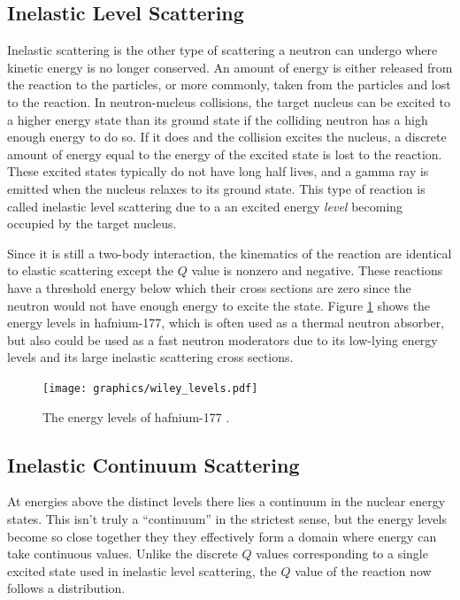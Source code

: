 \subsection{Inelastic Level Scattering}

Inelastic scattering is the other type of scattering a neutron can undergo where kinetic energy is no longer conserved.  An amount of energy is either released from the reaction to the particles, or more commonly, taken from the particles and lost to the reaction.  In neutron-nucleus collisions, the target nucleus can be excited to a higher energy state than its ground state if the colliding neutron has a high enough energy to do so.  If it does and the collision excites the nucleus, a discrete amount of energy equal to the energy of the excited state is lost to the reaction.  These excited states typically do not have long half lives, and a gamma ray is emitted when the nucleus relaxes to its ground state.  This type of reaction is called inelastic level scattering due to a an excited energy \emph{level} becoming occupied by the target nucleus.  

Since it is still a two-body interaction, the kinematics of the reaction are identical to elastic scattering except the $Q$ value is nonzero and negative.  These reactions have a threshold energy below which their cross sections are zero since the neutron would not have enough energy to excite the state.   Figure \ref{Elevels} shows the energy levels in hafnium-177, which is often used as a thermal neutron absorber, but also could be used as a fast neutron moderators due to its low-lying energy levels and its large inelastic scattering cross sections.

\begin{figure}[h!]
  \centering
    \texttt{[image: graphics/wiley\_levels.pdf]}
     \caption{The energy levels of hafnium-177 \cite{krane}. \label{Elevels}}
\end{figure}

\subsection{Inelastic Continuum Scattering}

At energies above the distinct levels there lies a continuum in the nuclear energy states.  This isn't truly a ``continuum'' in the strictest sense, but the energy levels become so close together they they effectively form a domain where energy can take continuous values.  Unlike the discrete $Q$ values corresponding to a single excited state used in inelastic level scattering, the $Q$ value of the reaction now follows a distribution.  

